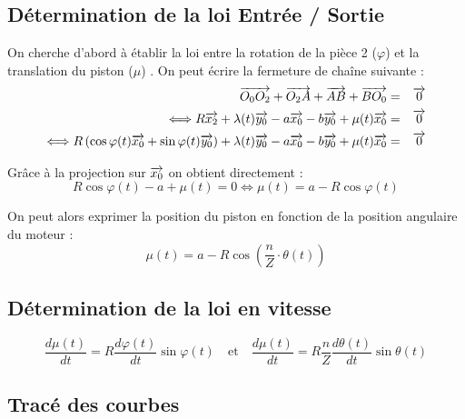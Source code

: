 \documentclass[10pt]{article}
\begin{document}
\subsection{Détermination de la loi Entrée / Sortie}
On cherche d'abord à établir la loi entre la rotation de la pièce 2 ($\varphi$) et la translation du piston ($\mu$) . On peut écrire la fermeture de chaîne suivante : 
\begin{eqnarray*}
\overrightarrow{O_0 O_2} + \overrightarrow{O_2 A} + \overrightarrow{AB} + \overrightarrow{B O_0} &= &\overrightarrow{0}\\
\Longleftrightarrow 
 R \overrightarrow{x_2} + \lambda(t) \overrightarrow{y_0} - a \overrightarrow{x_0} - b \overrightarrow{y_0} + \mu(t) \overrightarrow{x_0} &=& \overrightarrow{0}  \\
 \Longleftrightarrow
 R \left(\cos \varphi(t) \overrightarrow{x_0} + \sin\varphi(t) \overrightarrow{y_0} \right) + \lambda(t) \overrightarrow{y_0} - a \overrightarrow{x_0} - b \overrightarrow{y_0} + \mu(t) \overrightarrow{x_0} &=& \overrightarrow{0}
\end{eqnarray*}

Grâce à la projection sur $\overrightarrow{x_0}$ on obtient directement : 
$$
 R \cos \varphi (t) - a + \mu(t)  = 0 \Longleftrightarrow
 \mu(t)= a - R \cos\varphi (t)
$$

On peut alors exprimer la position du piston en fonction de la position angulaire du moteur : 
$$  \mu(t)= a - R \cos\left(\dfrac{n}{Z} \cdot \theta (t)\right) $$

\subsection{Détermination de la loi en vitesse}
$$
 \dfrac{d\mu(t)}{dt}=  R  \dfrac{d\varphi(t)}{dt}\sin\varphi (t) 
 \quad \text{et} \quad
 \dfrac{d\mu(t)}{dt}=  R  \dfrac{n}{Z} \dfrac{d\theta(t)}{dt}\sin\theta (t) 
$$

\subsection{Tracé des courbes} 

\begin{thebibliography}{2}
\end{thebibliography}
\end{document}
